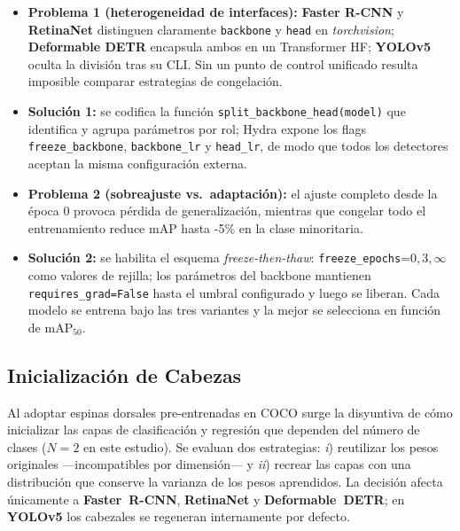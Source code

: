 \begin{itemize}
   \item \textbf{Problema 1 (heterogeneidad de interfaces):} \textbf{Faster R-CNN} y \textbf{RetinaNet} distinguen claramente \texttt{backbone} y \texttt{head} en \textit{torchvision}; \textbf{Deformable DETR} encapsula ambos en un Transformer HF; \textbf{YOLOv5} oculta la división tras su CLI.
         Sin un punto de control unificado resulta imposible comparar estrategias de congelación.
   \item \textbf{Solución 1:} se codifica la función \texttt{split\_backbone\_head(model)} que identifica y agrupa parámetros por rol; Hydra expone los flags \texttt{freeze\_backbone}, \texttt{backbone\_lr} y \texttt{head\_lr}, de modo que todos los detectores aceptan la misma configuración externa.
   \item \textbf{Problema 2 (sobreajuste vs.\ adaptación):} el ajuste completo desde la época 0 provoca pérdida de generalización, mientras que congelar todo el entrenamiento reduce \(\text{mAP}\) hasta -5\% en la clase minoritaria.
   \item \textbf{Solución 2:} se habilita el esquema \emph{freeze-then-thaw}:
         \texttt{freeze\_epochs}=0,\,3,\,\(\infty\) como valores de rejilla;
         los parámetros del backbone mantienen \texttt{requires\_grad=False} hasta el umbral configurado y luego se liberan.
         Cada modelo se entrena bajo las tres variantes y la mejor se selecciona en función de \(\text{mAP}_{50}\).
\end{itemize}

\subsection{Inicialización de Cabezas}\label{ssec:init_heads}

Al adoptar espinas dorsales pre-entrenadas en COCO surge la disyuntiva de cómo inicializar las capas de clasificación y regresión que dependen del número de clases (\(N=2\) en este estudio).
Se evaluan dos estrategias:
\emph{i}) reutilizar los pesos originales —incompatibles por dimensión— y
\emph{ii}) recrear las capas con una distribución que conserve la varianza de los pesos aprendidos.
La decisión afecta únicamente a \textbf{Faster~R-CNN}, \textbf{RetinaNet} y \textbf{Deformable~DETR}; en \textbf{YOLOv5} los cabezales se regeneran internamente por defecto.

